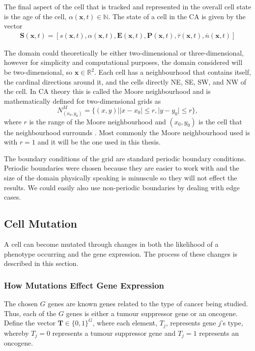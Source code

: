 \documentclass[\main/thesis.tex]{subfiles}
\begin{document}
The final aspect of the cell that is tracked and represented in the overall cell state is the age of the cell, $\alpha(\boldsymbol{x}, t) {\in} \mathbb{N}$. The state of a cell in the CA is given by the vector
\begin{align}
\boldsymbol{S}(\boldsymbol{x}, t) {=} [ s(\boldsymbol{x}, t), 
                                        \alpha(\boldsymbol{x}, t),
                                        \boldsymbol{E}(\boldsymbol{x}, t),
                                        \boldsymbol{P}(\boldsymbol{x}, t),
                                        \overline{\tau}(\boldsymbol{x}, t),
                                        \overline{n}(\boldsymbol{x}, t) ]
\label{eq:StateVector}
\end{align}

The domain could theoretically be either two-dimensional or \newline three-dimensional, however for simplicity and computational purposes, the domain considered will be two-dimensional, so $\boldsymbol{x} {\in} \mathbb{R}^2$. Each cell has a neighbourhood that contains itself, the cardinal directions 
around it, and the cells directly NE, SE, SW, and NW of the cell. In CA theory this is called the Moore neighbourhood and is mathematically defined for two-dimensional grids as
\begin{equation}
N^M_{(x_0, y_0)} {=} \{ (x, y) | |x {-} x_0| {\le} r, |y {-} y_0| {\le} r \},
\label{eq:MooreNeighbourhood}
\end{equation}
where $r$ is the range of the Moore neighbourhood and $(x_0, y_0)$ is the cell that the neighbourhood 
surrounds \cite{Gray}. Most commonly the Moore neighbourhood used is with $r {=} 1$ and it will be the one used in this thesis. 

The boundary conditions of the grid are standard periodic boundary conditions. 
Periodic boundaries were chosen because they are easier to work with and the size of the domain physically speaking is minuscule so they will not effect the results. We could easily also use non-periodic boundaries by dealing with edge cases.

\subsection{Cell Mutation}
A cell can become mutated through changes in both the likelihood of a phenotype 
occurring and the gene expression. The process of these changes is described in 
this section.

\subsubsection{How Mutations Effect Gene Expression}
The chosen $G$ genes are known genes related to the type of cancer being studied.
Thus, each of the $G$ genes is either a tumour suppressor gene or an oncogene.
Define the vector $\boldsymbol{T} {\in} \{ 0, 1 \}^G$, where each element, 
$T_{j}$, represents gene $j$'s type, whereby $T_{j} {=} 0$ 
represents a tumour suppressor gene and $T_{j} {=} 1$ represents an oncogene.
\end{document}
